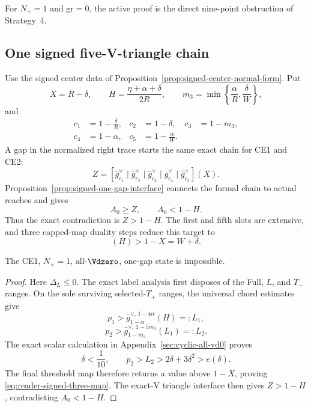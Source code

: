For $N_+=1$ and $\mathrm{gr}=0$, the active proof is the direct nine-point
obstruction of Strategy~4.

\subsection{One signed five-V-triangle chain}

Use the signed center data of
Proposition~\ref{prop:signed-center-normal-form}.  Put
\[
 X=R-\delta,\qquad
 H=\frac{\eta+\alpha+\delta}{2R},\qquad
 m_3=\min\left\{\frac\alpha R,\frac\delta W\right\},
\]
and
\[
 \begin{aligned}
 c_1&=1-\frac\delta R,&c_2&=1-\delta,&c_3&=1-m_3,\\
 c_4&=1-\alpha,&c_5&=1-\frac\alpha W.
 \end{aligned}
\]
A gap in the normalized right trace starts the same exact chain for CE1 and
CE2:
\begin{equation}
 Z=
 [\widehat g_{c_1}^\vee
 \mid\widehat g_{c_2}^\vee
 \mid\widehat g_{c_3}^\vee
 \mid\widehat g_{c_4}^\vee
 \mid\widehat g_{c_5}^\vee](X).
 \label{eq:reader-exact-five-chain}
\end{equation}
Proposition~\ref{prop:signed-one-gap-interface} connects the formal chain to
actual reaches and gives
\[
 A_0\ge Z,\qquad A_0<1-H.
\]
Thus the exact contradiction is $Z>1-H$.  The first and fifth slots are
extensive, and three capped-map duality steps reduce this target to
\begin{equation}
 [\widehat g_{1-\alpha}^\vee
  \mid\widehat g_{1-m_3}^\vee
  \mid\widehat g_{1-\delta}^\vee](H)
 >1-X=W+\delta.
 \label{eq:reader-signed-three-map}
\end{equation}

\begin{proposition}
\label{prop:reader-ce1-one-gap}
The CE1, $N_+=1$, all-$\Vdzero$, one-gap state is impossible.
\end{proposition}

\begin{proof}
Here $\Delta_L\le0$.  The exact label analysis first disposes of the Full,
$L$, and $T_-$ ranges.  On the sole surviving selected-$T_+$ ranges, the
universal chord estimates give
\[
 p_1>
 \widehat g_{1-\alpha}^{\vee,\,1-4\alpha}(H)=:L_1,
\]
\[
 p_2>
 \widehat g_{1-m_3}^{\vee,\,1-5m_3}(L_1)=:L_2.
\]
The exact scalar calculation in Appendix~\ref{sec:cyclic-all-vd0} proves
\[
 \delta<\frac1{10},\qquad
 p_2>L_2>2\delta+3\delta^2>e(\delta).
\]
The final threshold map therefore returns a value above $1-X$, proving
\eqref{eq:reader-signed-three-map}.  The exact-V triangle interface then gives
$Z>1-H$, contradicting $A_0<1-H$.
\end{proof}

